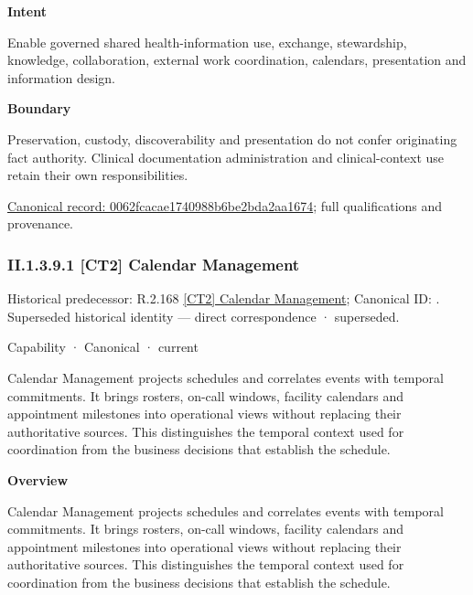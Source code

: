 \textbf{Intent}



Enable governed shared health-information use, exchange, stewardship, knowledge, collaboration, external work coordination, calendars, presentation and information design.



\textbf{Boundary}



Preservation, custody, discoverability and presentation do not confer originating fact authority. Clinical documentation administration and clinical-context use retain their own responsibilities.


{\footnotesize \href{../../../../continuum/strategy/capability/0062fcacae1740988b6be2bda2aa1674.md}{Canonical record: 0062fcacae1740988b6be2bda2aa1674}; full qualifications and provenance.}\par
\subsubsection*{II.1.3.9.1 [CT2] Calendar Management}
\label{navigation:II.1.3.9.1}

{\small Historical predecessor: R.2.168 \hyperref[element:8b42aac6083441caa78b59f5e62eebd9]{[CT2] Calendar Management}; Canonical ID: \texttt{}. Superseded historical identity — direct correspondence · superseded.}\par
\label{element:7669036f7e6749219412fc64df5f7064}
{\small Capability · Canonical · current}\par

Calendar Management projects schedules and correlates events with temporal commitments. It brings rosters, on-call windows, facility calendars and appointment milestones into operational views without replacing their authoritative sources. This distinguishes the temporal context used for coordination from the business decisions that establish the schedule.



\textbf{Overview}



Calendar Management projects schedules and correlates events with temporal commitments. It brings rosters, on-call windows, facility calendars and appointment milestones into operational views without replacing their authoritative sources. This distinguishes the temporal context used for coordination from the business decisions that establish the schedule.



